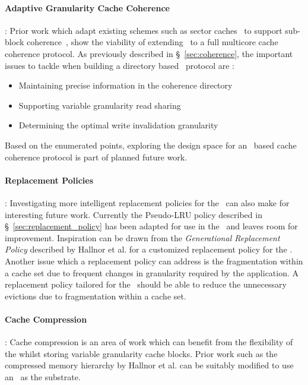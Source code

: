 \paragraph{Adaptive Granularity Cache Coherence}: Prior work which adapt existing schemes such as sector caches~\cite{Rothman_Smith_2000} to support sub-block coherence~\cite{Subblock_Coherence,minerva}, show the viability of extending \AC\ to a full multicore cache coherence protocol. As previously described in \S~\ref{sec:coherence}, the important issues to tackle when building a directory based \AC\ protocol are :
\begin{itemize}[noitemsep]
	\item Maintaining precise information in the coherence directory
	\item Supporting variable granularity read sharing
	\item Determining the optimal write invalidation granularity
\end{itemize}
Based on the enumerated points, exploring the design space for an \AC\ based cache coherence protocol is part of planned future work. 

\paragraph{Replacement Policies}: Investigating more intelligent replacement policies for the \AC\ can also make for interesting future work. Currently the Pseudo-LRU policy described in \S~\ref{sec:replacement_policy} has been adapted for use in the \AC\ and leaves room for improvement. Inspiration can be drawn from the \textit{Generational Replacement Policy} described by Hallnor et al.\cite{Hallnor_Reinhardt_2000} for a customized replacement policy for the \AC{}. Another issue which a replacement policy can address is the fragmentation within a cache set due to frequent changes in granularity required by the application. A replacement policy tailored for the \AC\ should be able to reduce the unnecessary evictions due to fragmentation within a cache set.

\paragraph{Cache Compression}: Cache compression is an area of work which can benefit from the flexibility of the \AC{} whilst storing variable granularity cache blocks. Prior work such as the compressed memory hierarchy by Hallnor et al.\cite{Hallnor04acompressed} can be suitably modified to use an \AC\ as the substrate.

